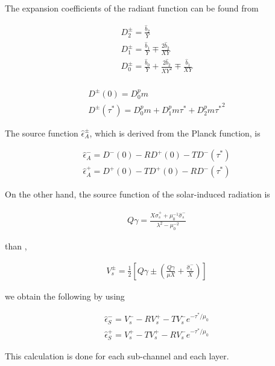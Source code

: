 The expansion coefficients of the radiant function can be found from

\begin{eqnarray}
  D_2^\pm  =  \frac{\hat{b}_2}{Y} \\
  D_1^\pm  =  \frac{\hat{b}_1}{Y} \mp  \frac{2 \hat{b}_2}{XY} \\
  D_0^\pm  =  \frac{\hat{b}_0}{Y} + \frac{2 \hat{b}_2}{XY^2} 
                \mp  \frac{\hat{b}_1}{XY} \\
\end{eqnarray}

\begin{eqnarray}
  D^\pm(0)       =  D_0^pm \\
  D^\pm(\tau^*)  =  D_0^pm + D_1^pm \tau^* + D_2^pm {\tau^*}^2
\end{eqnarray}

The source function \(\hat{\epsilon}_A^\pm\), which is derived from the
Planck function, is

\begin{eqnarray}
  \hat{\epsilon}_A^-  =  D^-(0) - R D^+(0) - T D^-(\tau^*) \\
  \hat{\epsilon}_A^+  =  D^+(0) - T D^+(0) - R D^-(\tau^*)
\end{eqnarray}

On the other hand, the source function of the solar-induced radiation is

\begin{eqnarray}
  Q\gamma = \frac{X\hat{\sigma}_s^+ + \mu_0^{-1} \hat{\sigma}_s^-}
                 {\lambda^2 - \mu_0^{-2} }
\end{eqnarray}

than ,

\begin{eqnarray}
  V_s^\pm = \frac{1}{2} \left[
             Q\gamma \pm \left( \frac{Q\gamma}{\mu X} 
                                + \frac{\hat{\sigma}_s^-}{X} \right)
                        \right]
\end{eqnarray}

we obtain the following by using

\begin{eqnarray}
  \hat{\epsilon}_S^-  =  V_s^- - R V_s^+ - T V_s^- e^{-\tau^*/\mu_0} \\
  \hat{\epsilon}_S^+  =  V_s^+ - T V_s^+ - R V_s^- e^{-\tau^*/\mu_0}
\end{eqnarray}

This calculation is done for each sub-channel and each layer.

